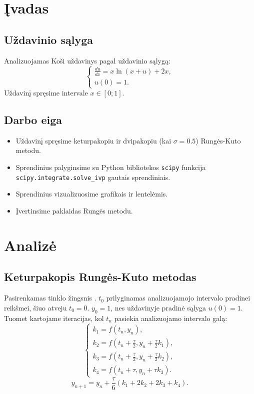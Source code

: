 \documentclass[]{VUMIFTemplateClass}
\begin{document}
\onehalfspacing


\tableofcontents
\onehalfspacing

\section{Įvadas}

\subsection{Uždavinio sąlyga}
Analizuojamas Koši uždavinys pagal uždavinio sąlygą:
\begin{equation}
    \begin{cases}
        \frac{du}{dx} = x \ln(x + u) + 2x,\\
        u(0) = 1.
    \end{cases}
\end{equation}
Uždavinį spręsime intervale $x \in [0; 1]$.

\subsection{Darbo eiga}
\begin{itemize}
    \item Uždavinį spręsime keturpakopiu ir dvipakopiu (kai $\sigma = 0.5$) Rungės-Kuto metodu.
    \item Sprendinius palyginsime su Python bibliotekos \texttt{scipy} funkcija \texttt{scipy.integrate.solve\_ivp} gautais sprendiniais.
    \item Sprendinius vizualizuosime grafikais ir lentelėmis.
    \item Įvertinsime paklaidas Rungės metodu.
\end{itemize}

\section{Analizė}
\subsection{Keturpakopis Rungės-Kuto metodas}
Pasirenkamas tinklo žingsnis \tau. $t_0$ prilyginamas analizuojamojo intervalo pradinei reikšmei, šiuo atveju $t_0 = 0$. $y_0 = 1$, nes uždavinyje pradinė sąlyga $u(0) = 1$. Tuomet kartojame iteracijas, kol $t_n$ pasiekia analizuojamo intervalo galą:
\begin{equation}
    \begin{cases}
        k_1 = f(t_n, y_n),\\
        k_2 = f(t_n + \frac{\tau}{2}, y_n + \frac{\tau}{2} k_1),\\
        k_3 = f(t_n + \frac{\tau}{2}, y_n + \frac{\tau}{2} k_2),\\
        k_4 = f(t_n + \tau, y_n + \tau k_3).
    \end{cases}
\end{equation}
\[ y_{n+1} = y_n + \frac{\tau}{6}(k_1 + 2k_2 + 2k_3 + k_4). \]
\end{document}
